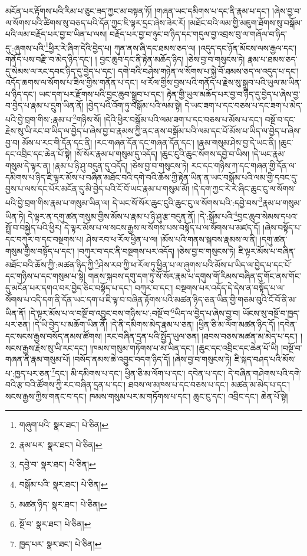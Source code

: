 མངོན་པར་རྟོགས་པའི་རིམ་པ་ཅུང་ཟད་ཀྱང་མ་བསྟན་ཏོ། །གཞན་ཡང་དམིགས་པ་དང་ནི་རྣམ་པ་དང་། །ཞེས་བྱ་བ་ལ་སོགས་པའི་ཚིགས་སུ་བཅད་པའི་དོན་ཀྱང་ཇི་ལྟར་དྲང་ཞེས་ཟེར་རོ། །མཐོང་བའི་ལམ་གྱི་མཇུག་ཐོགས་སུ་བསྒོམ་པའི་ལམ་བརྗོད་པར་བྱ་བ་ཡིན་པ་ལས། བརྗོད་པར་བྱ་བ་ཉུང་བ་ཉིད་དང་གདུལ་བྱ་འབྲས་བུ་ལ་གཞོལ་བ་ཉིད་དུ་:ཞུགས་པའི་\footnote{གཞུག་པའི་  སྣར་ཐང་།  པེ་ཅིན། }ཕྱིར་རེ་ཞིག་དེའི་བྱེད་པ། ཀུན་ནས་ཞི་དང་ཐམས་ཅད་ལ། །འདུད་དང་ཉོན་མོངས་ལས་རྒྱལ་དང་། གནོད་པས་བརྫི་བ་མེད་ཉིད་དང་། །
བྱང་ཆུབ་དང་ནི་རྟེན་མཆོད་ཉིད། །ཅེས་བྱ་བ་གསུངས་ཏེ། རྣམ་པ་ཐམས་ཅད་དུ་སེམས་ལ་རང་དབང་ཉིད་དུ་བྱེད་པ་དང་། དགེ་བའི་བཤེས་གཉེན་ལ་སོགས་པ་སྐྱེ་བོ་ཐམས་ཅད་ལ་འདུད་པ་དང་། འདོད་ཆགས་ལ་སོགས་པ་ཟིལ་གྱིས་གནོན་པ་དང་། ཕ་རོལ་གྱིས་བྱས་པའི་གནོད་པ་རྗེས་སུ་སྒྲུབ་པའི་ཡུལ་མ་ཡིན་པ་ཉིད་དང་། ཡང་དག་པར་རྫོགས་པའི་བྱང་ཆུབ་སྒྲུབ་པ་དང་། རྟེན་གྱི་ཡུལ་མཆོད་པར་བྱ་བ་ཉིད་དུ་བྱེད་པ་ཞེས་བྱ་བ་བྱེད་པ་རྣམ་པ་དྲུག་ཡིན་ནོ། །བྱེད་པའི་འོག་ཏུ་བསྒོམ་པའི་ལམ་སྟེ། དེ་ཡང་ཟག་པ་དང་བཅས་པ་དང་ཟག་པ་མེད་པའི་བྱེ་བྲག་གིས་:རྣམ་པ་\footnote{རྣམ་པར་  སྣར་ཐང་།  པེ་ཅིན། }གཉིས་སོ། །དེའི་ཕྱིར་བསྒོམ་པའི་ལམ་ཟག་པ་དང་བཅས་པ་མོས་པ་དང་། བསྔོ་བ་དང་རྗེས་སུ་ཡི་རང་བ་ཡིད་ལ་བྱེད་པ་ཞེས་བྱ་བ་རྣམས་ཀྱི་ནང་ནས་བསྒོམ་པའི་ལམ་དང་པོ་མོས་པ་ཡིད་ལ་བྱེད་པ་ཞེས་བྱ་བ། མོས་པ་རང་གི་དོན་དང་ནི། །རང་གཞན་དོན་དང་གཞན་དོན་དང་། །རྣམ་གསུམ་ཤེས་བྱ་དེ་ཡང་ནི། །ཆུང་དང་འབྲིང་དང་ཆེན་པོ་སྟེ། །སོ་སོར་རྣམ་པ་གསུམ་དུ་འདོད། །ཆུང་ངུའི་ཆུང་སོགས་དབྱེ་བ་ཡིས། །དེ་ཡང་རྣམ་གསུམ་དེ་ལྟར་ན། །རྣམ་པ་ཉི་ཤུ་བདུན་དུ་འདོད། །ཅེས་བྱ་བ་གསུངས་ཏེ། རང་དང་གཉིས་ཀ་དང་གཞན་གྱི་དོན་ལ་དམིགས་པ་ཉིད་ཇི་ལྟར་མོས་པ་བཞིན་མཐོང་བའི་དགེ་བའི་ཆོས་ཀྱི་རྟེན་ཡིན་ན་ཡང་བསྒོམ་པའི་ལམ་གྱི་དབང་དུ་བྱས་པ་ལས་དང་པོར་མངོན་དུ་མི་བྱེད་པའི་ངོ་བོ་ཡང་རྣམ་པ་གསུམ་མོ། །དེ་དག་ཀྱང་རེ་རེ་ཞིང་ཆུང་ངུ་ལ་སོགས་པའི་བྱེ་བྲག་གིས་རྣམ་པ་གསུམ་ཡིན་ལ། དེ་ཡང་སོ་སོར་ཆུང་ངུའི་ཆུང་ངུ་ལ་སོགས་པའི་:དབྱེ་བས་\footnote{དབྱེ་བ་  སྣར་ཐང་།  པེ་ཅིན། }རྣམ་པ་གསུམ་ཡིན་ཏེ། དེ་ལྟར་ན་དགུ་ཚན་གསུམ་གྱིས་མོས་པ་རྣམ་པ་ཉི་ཤུ་རྩ་བདུན་ནོ། །དེ་:སྒོམ་པའི་\footnote{བསྒོམ་པའི་  སྣར་ཐང་།  པེ་ཅིན། }བྱང་ཆུབ་སེམས་དཔའ་སྤྲོ་བ་བསྐྱེད་པའི་ཕྱིར། དེ་ལྟར་མོས་པ་ལ་སངས་རྒྱས་ལ་སོགས་པས་བསྟོད་པ་ལ་སོགས་པ་མཛད་དོ། །ཞེས་བསྟོད་པ་དང་བཀུར་བ་དང་བསྔགས་པ། ཤེས་རབ་ཕ་རོལ་ཕྱིན་པ་ལ། །མོས་པའི་གནས་སྐབས་རྣམས་ལ་ནི། །དགུ་ཚན་གསུམ་གྱིས་བསྟོད་པ་དང་། །བཀུར་བ་དང་ནི་བསྔགས་པར་འདོད། །ཅེས་བྱ་བ་གསུངས་ཏེ། ཇི་ལྟར་མོས་པ་བཞིན་མཐོང་བའི་ཆོས་ཀྱི་:མཚན་ཉིད་ཀྱི་\footnote{མཚན་ཉིད་  སྣར་ཐང་།  པེ་ཅིན། }ཤེས་རབ་ཀྱི་ཕ་རོལ་ཏུ་ཕྱིན་པ་ལ་ཞུགས་པའི་མོས་པ་ཡིད་ལ་བྱེད་པ་དང་པོ་དང་གཉིས་པ་དང་གསུམ་པ་སྟེ། གནས་སྐབས་དགུ་དག་ཏུ་སོ་སོར་རྣམ་པ་དགུས་གོ་རིམས་བཞིན་དུ་གོང་ནས་གོང་དུ་མངོན་པར་དགའ་བར་བྱེད་ཅིང་བསྟོད་པ་དང་། བཀུར་བ་དང་། བསྔགས་པར་འདོད་དེ་དེས་ན་བསྟོད་པ་ལ་སོགས་པ་འདི་དག་ནི་དོན་ཡང་དག་པ་ཇི་ལྟ་བ་བཞིན་རྟོགས་པའི་མཚན་ཉིད་ཅན་ཡིན་གྱི་གཅམ་བུའི་ངོ་བོ་ནི་མ་ཡིན་ནོ། །དེ་ལྟར་མོས་པ་ལ་བསྔོ་བ་འབྱུང་བས་གཉིས་པ་:བསྔོ་བ་\footnote{སྔོ་བ་  སྣར་ཐང་།  པེ་ཅིན། }ཡིད་ལ་བྱེད་པ་ཞེས་བྱ་བ། ཡོངས་སུ་བསྔོ་བ་ཁྱད་པར་ཅན། །དེ་ཡི་བྱེད་པ་མཆོག་ཡིན་ནོ། །དེ་ནི་དམིགས་མེད་རྣམ་པ་ཅན། །ཕྱིན་ཅི་མ་ལོག་མཚན་ཉིད་དོ། །དབེན་དང་སངས་རྒྱས་བསོད་ནམས་ཚོགས། །རང་བཞིན་དྲན་པའི་སྤྱོད་ཡུལ་ཅན། །ཐབས་བཅས་མཚན་མ་མེད་པ་དང་། །སངས་རྒྱས་རྗེས་སུ་ཡི་རང་དང་། །ཁམས་གསུམ་གཏོགས་པ་མ་ཡིན་དང་། །ཆུང་དང་འབྲིང་དང་ཆེན་པོ་ཡི། །བསྔོ་བ་གཞན་ནི་རྣམ་གསུམ་པོ། །བསོད་ནམས་ཆེ་འབྱུང་བདག་ཉིད་དོ། །ཞེས་བྱ་བ་གསུངས་ཏེ། ཇི་སྐད་བཤད་པའི་མོས་པ་:ཁྱད་པར་ཅན་\footnote{ཁྱད་པར་  སྣར་ཐང་།  པེ་ཅིན། }དང་། མི་དམིགས་པ་དང་། ཕྱིན་ཅི་མ་ལོག་པ་དང་། དབེན་པ་དང་། དེ་བཞིན་གཤེགས་པའི་དགེ་བའི་རྩ་བའི་ཚོགས་ཀྱི་རང་བཞིན་དྲན་པ་དང་། ཐབས་ལ་མཁས་པ་དང་བཅས་པ་དང་། མཚན་མ་མེད་པ་དང་། སངས་རྒྱས་ཀྱིས་གནང་བ་དང་། ཁམས་གསུམ་པར་མ་གཏོགས་པ་དང་། ཆུང་ངུ་དང་། འབྲིང་དང་། ཆེན་པོ་སྟེ། 